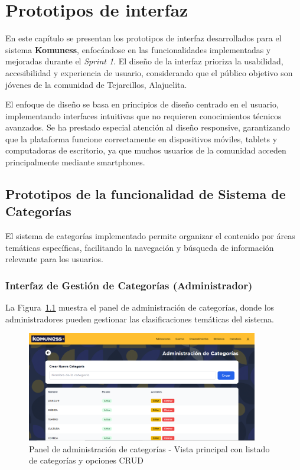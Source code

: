 \chapter{Prototipos de interfaz}
En este capítulo se presentan los prototipos de interfaz desarrollados para el sistema \textbf{Komuness}, 
enfocándose en las funcionalidades implementadas y mejoradas durante el \textit{Sprint 1}. 
El diseño de la interfaz prioriza la usabilidad, accesibilidad y experiencia de usuario, considerando 
que el público objetivo son jóvenes de la comunidad de Tejarcillos, Alajuelita.

El enfoque de diseño se basa en principios de diseño centrado en el usuario, implementando interfaces intuitivas 
que no requieren conocimientos técnicos avanzados. Se ha prestado especial atención al diseño responsive, 
garantizando que la plataforma funcione correctamente en dispositivos móviles, tablets y computadoras de escritorio, 
ya que muchos usuarios de la comunidad acceden principalmente mediante smartphones.

\section{Prototipos de la funcionalidad de Sistema de Categorías}

El sistema de categorías implementado permite organizar el contenido por áreas temáticas específicas, 
facilitando la navegación y búsqueda de información relevante para los usuarios.

\subsection{Interfaz de Gestión de Categorías (Administrador)}

La Figura~\ref{fig:categorias-admin} muestra el panel de administración de categorías, 
donde los administradores pueden gestionar las clasificaciones temáticas del sistema.

\begin{figure}[H]
  \centering
  \includegraphics[width=0.9\textwidth]{project/images/imagen.PNG}
  \caption{Panel de administración de categorías - Vista principal con listado de categorías y opciones CRUD}
  \label{fig:categorias-admin}
\end{figure}


